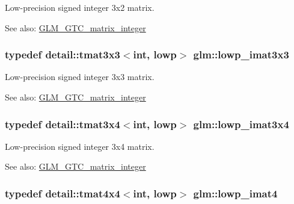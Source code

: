 Low-precision signed integer 3x2 matrix. \begin{Desc}
\item[See also:]\hyperlink{group__gtc__matrix__integer}{GLM\_\-GTC\_\-matrix\_\-integer} \end{Desc}
\hypertarget{group__gtc__matrix__integer_ge0d6068aaf9b1f8f06c6cc32941f9471}{
\subsubsection[lowp\_\-imat3x3]{\setlength{\rightskip}{0pt plus 5cm}typedef detail::tmat3x3$<$int, lowp$>$ {\bf glm::lowp\_\-imat3x3}}}
\label{group__gtc__matrix__integer_ge0d6068aaf9b1f8f06c6cc32941f9471}


Low-precision signed integer 3x3 matrix. \begin{Desc}
\item[See also:]\hyperlink{group__gtc__matrix__integer}{GLM\_\-GTC\_\-matrix\_\-integer} \end{Desc}
\hypertarget{group__gtc__matrix__integer_gba7c2c9f782278aaa10dad882d73ef0d}{
\subsubsection[lowp\_\-imat3x4]{\setlength{\rightskip}{0pt plus 5cm}typedef detail::tmat3x4$<$int, lowp$>$ {\bf glm::lowp\_\-imat3x4}}}
\label{group__gtc__matrix__integer_gba7c2c9f782278aaa10dad882d73ef0d}


Low-precision signed integer 3x4 matrix. \begin{Desc}
\item[See also:]\hyperlink{group__gtc__matrix__integer}{GLM\_\-GTC\_\-matrix\_\-integer} \end{Desc}
\hypertarget{group__gtc__matrix__integer_g7c687f14d923e05d5cf14aac41d10993}{
\subsubsection[lowp\_\-imat4]{\setlength{\rightskip}{0pt plus 5cm}typedef detail::tmat4x4$<$int, lowp$>$ {\bf glm::lowp\_\-imat4}}}
\label{group__gtc__matrix__integer_g7c687f14d923e05d5cf14aac41d10993}



